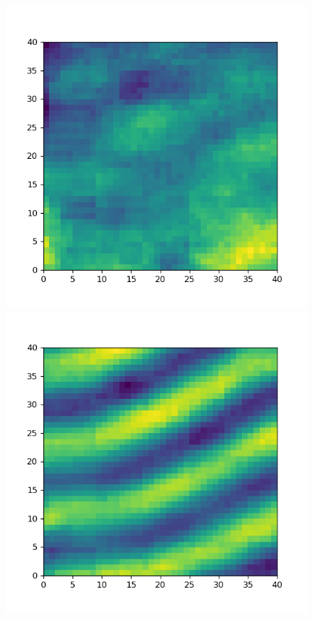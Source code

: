 \documentclass[letterpaper, 10 pt, conference]{ieeeconf}  %
\begin{document}
\begin{figure}[!t]
  \includegraphics[width=\linewidth]{images/movie_mode1.png}
\endminipage\hfill
{}
  \includegraphics[width=\linewidth]{images/movie_mode2.png}

\end{figure}
\end{document}
